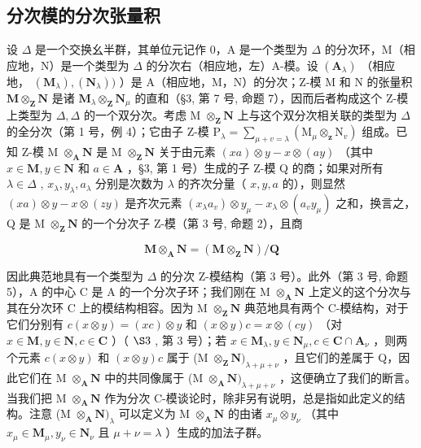 \subsection{分次模的分次张量积}

设 \(\Delta\) 是一个交换幺半群，其单位元记作 0，A 是一个类型为 \(\Delta\) 的分次环，M（相应地，N）是一个类型为 \(\Delta\) 的分次右（相应地，左）A-模。设 \((\mathbf{A}_{\lambda})\) （相应地， \((\mathbf{M}_{\lambda}), (\mathbf{N}_{\lambda}))\) ）是 A（相应地，M，N）的分次；Z-模 M 和 N 的张量积 \(\mathbf{M} \otimes_{\mathbf{Z}} \mathbf{N}\) 是诸 \(\mathbf{M}_{\lambda} \otimes_{\mathbf{Z}} \mathbf{N}_{\mu}\) 的直和（§3, 第 7 号, 命题 7），因而后者构成这个 Z-模上类型为 \(\Delta, \Delta\) 的一个双分次。考虑 M \(\otimes_{\mathbf{Z}} \mathbf{N}\) 上与这个双分次相关联的类型为 \(\Delta\) 的全分次（第 1 号，例 4）；它由子 Z-模 \(\mathrm{P}_{\lambda} = \sum_{\mu + v = \lambda} (\mathrm{M}_{\mu} \otimes_{\mathbf{z}} \mathrm{N}_{v})\) 组成。已知 Z-模 M \(\otimes_{\mathbf{A}} \mathbf{N}\) 是 M \(\otimes_{\mathbf{Z}} \mathbf{N}\) 关于由元素 \((xa) \otimes y - x \otimes (ay)\) （其中 \(x \in \mathbf{M}, y \in \mathbf{N}\) 和 \(a \in \mathbf{A}\) ，§3, 第 1 号）生成的子 Z-模 Q 的商；如果对所有 \(\lambda \in \Delta\) , \(x_{\lambda}, y_{\lambda}, a_{\lambda}\) 分别是次数为 \(\lambda\) 的齐次分量（ \(x, y, a\) 的），则显然 \((xa) \otimes y - x \otimes (zy)\) 是齐次元素 \((x_{\lambda}a_{v}) \otimes y_{\mu} - x_{\lambda} \otimes (a_{v}y_{\mu})\) 之和，换言之，Q 是 M \(\otimes_{\mathbf{Z}} \mathbf{N}\) 的一个分次子 Z-模（第 3 号, 命题 2），且商

\[
\mathbf {M} \otimes_ {\mathbf {A}} \mathbf {N} = (\mathbf {M} \otimes_ {\mathbf {Z}} \mathbf {N}) / \mathbf {Q}
\]

因此典范地具有一个类型为 \(\Delta\) 的分次 Z-模结构（第 3 号）。此外（第 3 号, 命题 5），A 的中心 C 是 A 的一个分次子环；我们刚在 M \(\otimes_{\mathbf{A}} \mathbf{N}\) 上定义的这个分次与其在分次环 C 上的模结构相容。因为 M \(\otimes_{\mathbf{Z}} \mathbf{N}\) 典范地具有两个 C-模结构，对于它们分别有 \(c(x \otimes y) = (xc) \otimes y\) 和 \((x \otimes y)c = x \otimes (cy)\) （对 \(x \in \mathbf{M}, y \in \mathbf{N}, c \in \mathbf{C}\) ）（ \(\S 3\) , 第 3 号）；若 \(x \in \mathbf{M}_{\lambda}, y \in \mathbf{N}_{\mu}, c \in \mathbf{C} \cap \mathbf{A}_{\nu}\) ，则两个元素 \(c(x \otimes y)\) 和 \((x \otimes y)c\) 属于 (M \(\otimes_{\mathbf{Z}} \mathbf{N})_{\lambda + \mu + \nu}\) ，且它们的差属于 Q，因此它们在 M \(\otimes_{\mathbf{A}} \mathbf{N}\) 中的共同像属于 (M \(\otimes_{\mathbf{A}} \mathbf{N})_{\lambda + \mu + \nu}\) ，这便确立了我们的断言。当我们把 M \(\otimes_{\mathbf{A}} \mathbf{N}\) 作为分次 C-模谈论时，除非另有说明，总是指如此定义的结构。注意 (M \(\otimes_{\mathbf{A}} \mathbf{N})_{\lambda}\) 可以定义为 M \(\otimes_{\mathbf{A}} \mathbf{N}\) 的由诸 \(x_{\mu} \otimes y_{\nu}\) （其中 \(x_{\mu} \in \mathbf{M}_{\mu}, y_{\nu} \in \mathbf{N}_{\nu}\) 且 \(\mu + \nu = \lambda\) ）生成的加法子群。

